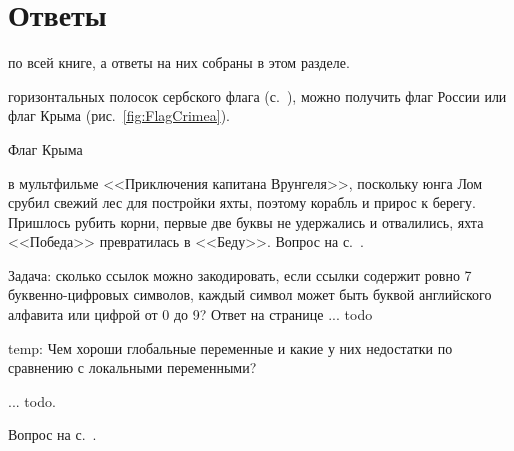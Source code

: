 \chapter{Ответы}
\label{ch:answers}


 по всей книге, а ответы на них собраны в этом разделе.

\begin{task}
    \label{answer:Tricolor-flags}
     горизонтальных полосок 
    сербского флага (с.~\pageref{fig:Srpska}), можно получить флаг России 
    или флаг Крыма (рис.~\ref{fig:FlagCrimea}). 
\end{task}

\begin{marginfigure}[0cm]
{%
\setlength{\fboxsep}{0pt}%
\setlength{\fboxrule}{1pt}%
%
}%
\caption{Флаг Крыма}
\label{fig:FlagCrimea}
\end{marginfigure}

\begin{task}
    \label{answer:Pobeda-beda}
     в мультфильме <<Приключения капитана 
    Врунгеля>>, поскольку юнга Лом срубил свежий лес для постройки яхты, поэтому корабль 
    и прирос к берегу. Пришлось рубить корни, первые две буквы не удержались и отвалились, 
    яхта <<Победа>> превратилась в <<Беду>>. 
    \small{Вопрос на с.~\pageref{fig:Pobeda-beda}.}
\end{task}

Задача: сколько ссылок можно закодировать, если ссылки содержит ровно 7 буквенно-цифровых символов,
     каждый символ может быть буквой английского алфавита 
     или цифрой от 0 до 9? Ответ на странице ... todo 

temp: Чем хороши глобальные переменные и какие у них недостатки
по сравнению с локальными переменными?

\begin{task}
    \label{answer:global-vars-pros-cons}
     ... todo. 

    \small{Вопрос на с.~\pageref{fig:block:proc:swap:colors}.}
\end{task}

